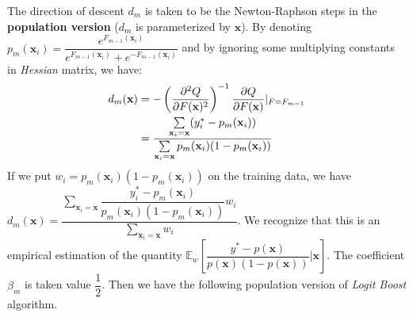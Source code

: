 \documentclass[a4paper,twoside,12pt]{article}
\begin{document}
The direction of descent $d_m$ is taken to be the Newton-Raphson steps in the \textbf{population version} ($d_m$ is parameterized by $\textbf{x}$). By denoting $p_m(\textbf{x}_i) = \dfrac{e^{F_{m-1}(\textbf{x}_i)}}{e^{F_{m-1}(\textbf{x}_i)} + e^{-F_{m-1}(\textbf{x}_i)}}$ and by ignoring some multiplying constants in \textsl{Hessian} matrix, we have:
\begin{align}
    d_m(\textbf{x}) &= -\left( \dfrac{\partial^2 Q}{\partial F(\textbf{x})^2}\right)^{-1}\dfrac{\partial Q}{\partial F(\textbf{x})} \vert_{F = F_{m-1}} \notag \\
    &= \dfrac{\sum\limits_{\textbf{x}_i = \textbf{x}} (y_i^{*} - p_m(\textbf{x}_i))}{\sum\limits_{\textbf{x}_i = \textbf{x}} p_m(\textbf{x}_i)(1 - p_m(\textbf{x}_i))} \notag
\end{align}
If we put $w_i = p_m(\textbf{x}_i)(1-p_m(\textbf{x}_i))$ on the training data, we have $d_m(\textbf{x}) = \dfrac{\sum\limits_{\textbf{x}_i = \textbf{x}} \dfrac{y_i^{*} - p_m(\textbf{x}_i)}{p_m(\textbf{x}_i)(1 - p_m(\textbf{x}_i))}w_i}{\sum\limits_{\textbf{x}_i = \textbf{x}} w_i}$. We recognize that this is an empirical estimation of the quantity $\mathbb{E}_w \left[ \dfrac{y^{*} - p(\textbf{x})}{p(\textbf{x})(1 - p(\textbf{x}))}\vert \textbf{x}\right]$. The coefficient $\beta_m$ is taken value $\dfrac{1}{2}$. Then we have the following population version of \textsl{Logit Boost} algorithm.

\begin{center}
\end{center}
\end{document}
